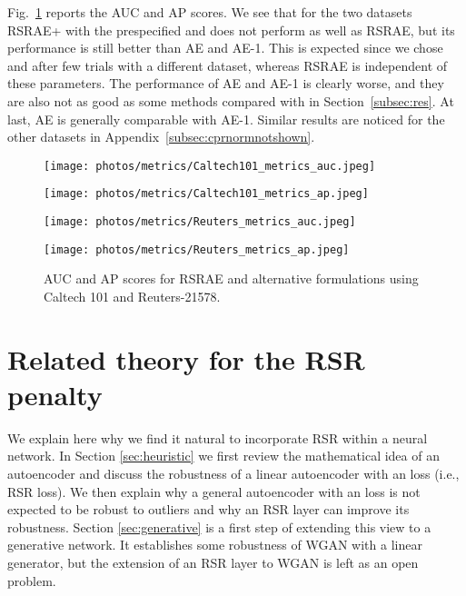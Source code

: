 \documentclass{article} \usepackage{iclr2020_conference,times}
\def\Secref#1{Section~\ref{#1}}
\begin{document}
Fig.~\ref{fig:cprall} reports the AUC and AP scores. We see that for the two datasets RSRAE+ with the prespecified  and  does not perform as well as RSRAE, but its performance is still better than AE and AE-1. This is expected since we chose  and  after few trials with a different dataset, whereas RSRAE is independent of these parameters.
The performance of AE and AE-1 is clearly worse, and they are also not as good as some methods compared with in \Secref{subsec:res}.
At last, AE is generally comparable with AE-1. Similar results are noticed for the other datasets in Appendix~\ref{subsec:cprnormnotshown}.





\begin{figure}[ht]
\centering
\begin{minipage}[t]{0.48\textwidth}
\centering
\texttt{[image: photos/metrics/Caltech101\_metrics\_auc.jpeg]}
\end{minipage}
\begin{minipage}[t]{0.48\textwidth}
\centering
\texttt{[image: photos/metrics/Caltech101\_metrics\_ap.jpeg]}
\end{minipage}







\centering
\begin{minipage}[t]{0.48\textwidth}
\centering
\texttt{[image: photos/metrics/Reuters\_metrics\_auc.jpeg]}
\end{minipage}
\begin{minipage}[t]{0.48\textwidth}
\centering
\texttt{[image: photos/metrics/Reuters\_metrics\_ap.jpeg]}
\end{minipage}
\caption{AUC and AP scores for RSRAE and alternative formulations using Caltech 101 and Reuters-21578.}
\label{fig:cprall}
\end{figure}








\section{Related theory for the RSR penalty}
\label{sec:relatedtheory}

We explain here why we find it natural to incorporate RSR within a neural network. In Section \ref{sec:heuristic} we first review the mathematical idea of an autoencoder and discuss the robustness of a linear autoencoder with an  loss (i.e., RSR loss). We then explain why a general autoencoder with an   loss is not expected to be robust to outliers and why an RSR layer can improve its robustness. Section \ref{sec:generative} is a first step of extending this view to a generative network. It establishes some robustness of WGAN with a linear generator, but the extension of an RSR layer to WGAN is left as an open problem. 
\end{document}

